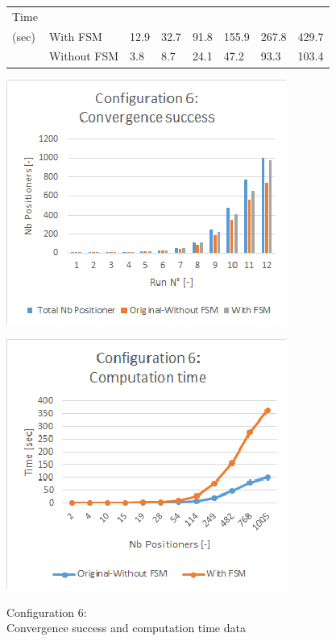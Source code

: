 \documentclass[]{spie}  %
\begin{document}
\begin{figure}[H]
\begin{minipage}{8.7cm}
{\begin{tabular}{|l|l|l|l|l|l|l|l|}
				\hline
				Time\\(sec) & With FSM  & 12.9 & 32.7  & 91.8 & 155.9 & 267.8 & 429.7 \\
				\cline{2-8}
				& Without FSM  & 3.8  & 8.7 & 24.1 & 47.2 & 93.3  & 103.4 \\
				\hline
			\end{tabular}
			}
			\label{configuration5_result} 
		\end{minipage}
		\begin{minipage}{9cm}
			\begin{minipage}[t]{4.2cm}
				\includegraphics[scale=0.56]{images/configuration6_conv}
				\label{configuration1_conv}
			\end{minipage}
			\begin{minipage}[t]{1.0cm}
				\includegraphics[scale=0.56]{images/configuration6_time}
				\label{configuration1_time}
			\end{minipage}
			\caption{\centering Configuration 6:\\
				Convergence success and computation time data
}
\end{minipage}
\end{figure}
\end{document}
